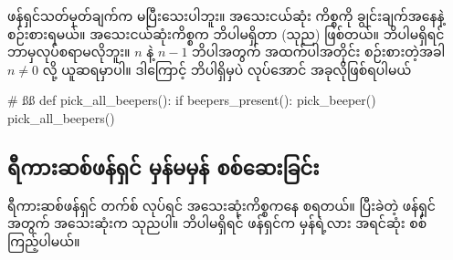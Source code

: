 ဖန်ရှင်သတ်မှတ်ချက်က မပြီးသေးပါဘူး။ အသေးငယ်ဆုံး ကိစ္စကို ချွင်းချက်အနေနဲ့ စဉ်းစားရမယ်။  အသေးငယ်ဆုံးကိစ္စက ဘိပါမရှိတာ (သုည) ဖြစ်တယ်။ ဘိပါမရှိရင် ဘာမှလုပ်စရာမလိုဘူး။ $n$ နဲ့ $n - 1$ ဘိပါအတွက် အထက်ပါအတိုင်း စဉ်းစားတဲ့အခါ $n \neq 0$ လို့ ယူဆရမှာပါ။ ဒါကြောင့် ဘိပါရှိမှပဲ လုပ်အောင် အခုလိုဖြစ်ရပါမယ်

%
\begin{py}
# ßß
def pick_all_beepers():
    if beepers_present():
        pick_beeper()
        pick_all_beepers()
\end{py}
%


\subsection*{ရီကားဆစ်ဖန်ရှင် မှန်မမှန် စစ်ဆေးခြင်း}
ရီကားဆစ်ဖန်ရှင် တက်စ်  လုပ်ရင် အသေးဆုံးကိစ္စကနေ စရတယ်။ ပြီးခဲတဲ့ ဖန်ရှင်အတွက် အသေးဆုံးက သုညပါ။ ဘိပါမရှိရင် ဖန်ရှင်က မှန်ရဲ့လား အရင်ဆုံး စစ်ကြည့်ပါမယ်။


